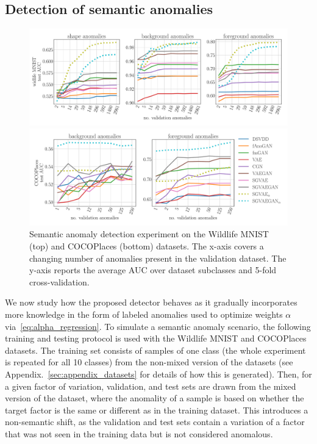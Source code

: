 \subsection{Detection of semantic anomalies} 
\begin{figure}[ht!]
    \centering
    \includegraphics[width=\textwidth]{data/chapter_sgvaegan/fig6_multifactor_experiments_wmnist.pdf}
    
    \includegraphics[width=\textwidth]{data/chapter_sgvaegan/fig7_multifactor_experiments_coco.pdf}
    \caption{Semantic anomaly detection experiment on the Wildlife MNIST (top) and COCOPlaces (bottom) datasets. The x-axis covers a changing number of anomalies present in the validation dataset. The y-axis reports the average AUC over dataset subclasses and 5-fold cross-validation.}
    \label{fig:multifactor}
\end{figure}
We now study how the proposed detector behaves as it gradually incorporates more knowledge in the form of labeled anomalies used to optimize weights $\alpha$ via~\eqref{eq:alpha_regression}. To simulate a semantic anomaly scenario, the following training and testing protocol is used with the Wildlife MNIST and COCOPlaces datasets. The training set consists of samples of one class (the whole experiment is repeated for all 10 classes) from the non-mixed version of the datasets (see Appendix.~\ref{sec:appendix_datasets} for details of how this is generated). Then, for a given factor of variation, validation, and test sets are drawn from the mixed version of the dataset, where the anomality of a sample is based on whether the target factor is the same or different as in the training dataset. This introduces a non-semantic shift, as the validation and test sets contain a variation of a factor that was not seen in the training data but is not considered anomalous. 

